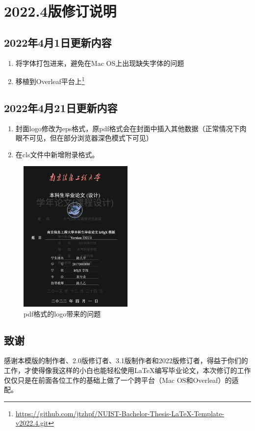 \section{2022.4版修订说明}

\subsection{2022年4月1日更新内容}

\begin{enumerate}[1、]
    \item 将字体打包进来，避免在Mac OS上出现缺失字体的问题
    \item 移植到Overleaf平台上\footnote{\url{https://github.com/jtzhpf/NUIST-Bachelor-Thesis-LaTeX-Template-v2022.4.git}}
\end{enumerate}

\subsection{2022年4月21日更新内容}


\begin{enumerate}[1、]
    \item 封面logo修改为eps格式，原pdf格式会在封面中插入其他数据（正常情况下肉眼不可见，但在部分浏览器深色模式下可见）
    \item 在cls文件中新增附录格式。
\end{enumerate}


\begin{figure}[htbp]
    \center
    \includegraphics[width=0.5\textwidth]{figs/color/problem.png}
    \caption{pdf格式的logo带来的问题}
    \label{fig:problem}
\end{figure}


\subsection{致谢}
感谢本模版的制作者、2.0版修订者、3.1版制作者和2022版修订者，得益于你们的工作，才使得像我这样的小白也能轻松使用\LaTeX 编写毕业论文，本次修订的工作仅仅只是在前面各位工作的基础上做了一个跨平台（Mac OS和Overleaf）的适配。